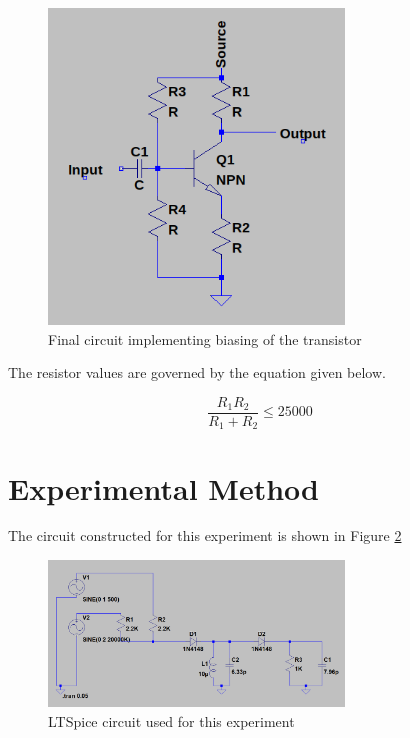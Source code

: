 \documentclass[12pt, a4paper]{article}
\begin{document}
 	\begin{figure}[H]
 		\centering
		\label{fig:biasing_transistor}
		\includegraphics[width=0.7\textwidth]{images/biasing_transistor_circuit.png}
		\caption{Final circuit implementing biasing of the transistor}
 	\end{figure}

 	The resistor values are governed by the equation given below.

 	\[
 		\frac{R_1R_2}{R_1+R_2} \le 25000
 	\]



\section{Experimental Method} %
\label{sec:experimental_method}
	The circuit constructed for this experiment is shown in Figure \ref{fig:circuit_1}
	\begin{figure}[H]
		\centering
		\label{fig:circuit_1}
		\includegraphics[width=0.7\textwidth]{images/circuit_1.png}
		\caption{LTSpice circuit used for this experiment}
	\end{figure}
\end{document}

